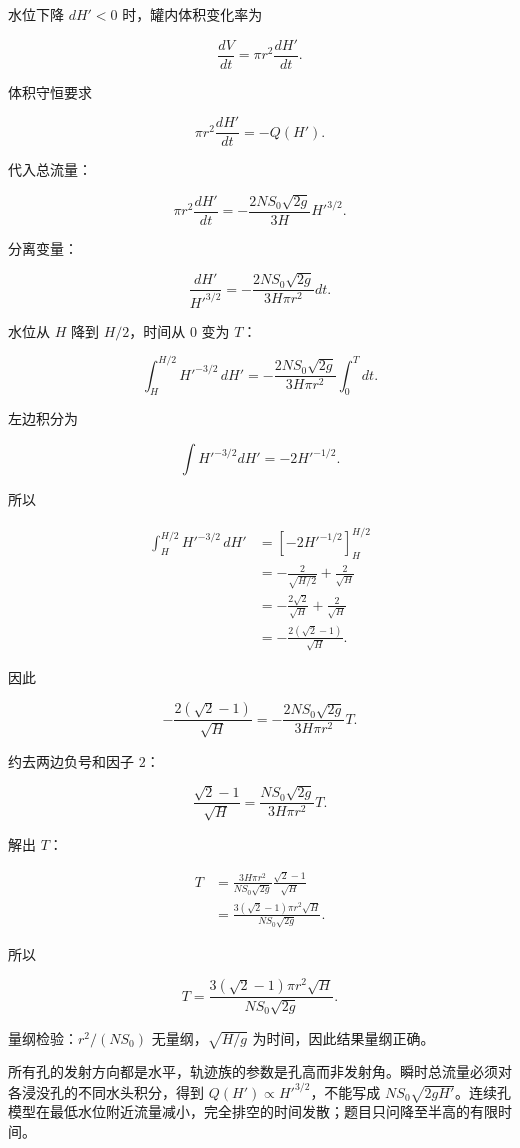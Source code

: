 \documentclass[12pt,a4paper,UTF8]{ctexart}
\begin{document}
水位下降 \(dH'<0\) 时，罐内体积变化率为

\[\frac{dV}{dt}
=\pi r^2\frac{dH'}{dt}.\]

体积守恒要求

\[\pi r^2\frac{dH'}{dt}
=-Q(H').\]

代入总流量：

\[\pi r^2\frac{dH'}{dt}
=-\frac{2NS_0\sqrt{2g}}{3H}
H'^{3/2}.\]

分离变量：

\[\frac{dH'}{H'^{3/2}}
=-\frac{2NS_0\sqrt{2g}}
{3H\pi r^2}dt.\]

水位从 \(H\) 降到 \(H/2\)，时间从 \(0\) 变为 \(T\)：

\[\int_H^{H/2}H'^{-3/2}\,dH'
=-\frac{2NS_0\sqrt{2g}}
{3H\pi r^2}
\int_0^Tdt.\]

左边积分为

\[\int H'^{-3/2}dH'=-2H'^{-1/2}.\]

所以

\[\begin{aligned}
\int_H^{H/2}H'^{-3/2}\,dH'
&=\left[-2H'^{-1/2}\right]_H^{H/2}\\
&=-\frac{2}{\sqrt{H/2}}+\frac2{\sqrt H}\\
&=-\frac{2\sqrt2}{\sqrt H}+\frac2{\sqrt H}\\
&=-\frac{2(\sqrt2-1)}{\sqrt H}.
\end{aligned}\]

因此

\[-\frac{2(\sqrt2-1)}{\sqrt H}
=-\frac{2NS_0\sqrt{2g}}
{3H\pi r^2}T.\]

约去两边负号和因子 \(2\)：

\[\frac{\sqrt2-1}{\sqrt H}
=\frac{NS_0\sqrt{2g}}
{3H\pi r^2}T.\]

解出 \(T\)：

\[\begin{aligned}
T
&=\frac{3H\pi r^2}{NS_0\sqrt{2g}}
\frac{\sqrt2-1}{\sqrt H}\\
&=\frac{3(\sqrt2-1)\pi r^2\sqrt H}
{NS_0\sqrt{2g}}.
\end{aligned}\]

所以

\[\boxed{
T=
\frac{3(\sqrt2-1)\pi r^2\sqrt H}
{NS_0\sqrt{2g}}
}.\]

量纲检验：\(r^2/(NS_0)\) 无量纲，\(\sqrt{H/g}\)
为时间，因此结果量纲正确。

所有孔的发射方向都是水平，轨迹族的参数是孔高而非发射角。瞬时总流量必须对各浸没孔的不同水头积分，得到
\(Q(H')\propto H'^{3/2}\)，不能写成
\(NS_0\sqrt{2gH'}\)。连续孔模型在最低水位附近流量减小，完全排空的时间发散；题目只问降至半高的有限时间。
\end{document}
